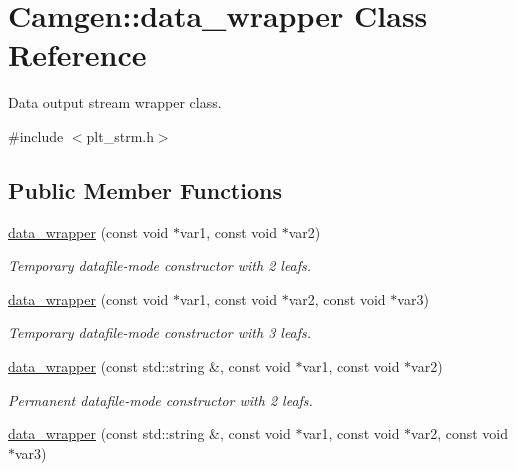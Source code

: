 \hypertarget{a00118}{\section{Camgen\-:\-:data\-\_\-wrapper Class Reference}
\label{a00118}
}


Data output stream wrapper class.  




{\ttfamily \#include $<$plt\-\_\-strm.\-h$>$}

\subsection*{Public Member Functions}
\begin{DoxyCompactItemize}
\item 
\hypertarget{a00118_a6cd8e44f93a3b9bd5d26f92fa41e60e0}{\hyperlink{a00118_a6cd8e44f93a3b9bd5d26f92fa41e60e0}{data\-\_\-wrapper} (const void $\ast$var1, const void $\ast$var2)}\label{a00118_a6cd8e44f93a3b9bd5d26f92fa41e60e0}

\begin{DoxyCompactList}\small\item\em Temporary datafile-\/mode constructor with 2 leafs. \end{DoxyCompactList}\item 
\hypertarget{a00118_ab7febefd6f251fdcbb279389f7dab4c0}{\hyperlink{a00118_ab7febefd6f251fdcbb279389f7dab4c0}{data\-\_\-wrapper} (const void $\ast$var1, const void $\ast$var2, const void $\ast$var3)}\label{a00118_ab7febefd6f251fdcbb279389f7dab4c0}

\begin{DoxyCompactList}\small\item\em Temporary datafile-\/mode constructor with 3 leafs. \end{DoxyCompactList}\item 
\hypertarget{a00118_a79ef419d020f7baf11dafb83ffe6d837}{\hyperlink{a00118_a79ef419d020f7baf11dafb83ffe6d837}{data\-\_\-wrapper} (const std\-::string \&, const void $\ast$var1, const void $\ast$var2)}\label{a00118_a79ef419d020f7baf11dafb83ffe6d837}

\begin{DoxyCompactList}\small\item\em Permanent datafile-\/mode constructor with 2 leafs. \end{DoxyCompactList}\item 
\hypertarget{a00118_ac7ffb36f13890d5771591a1b50c17cfd}{\hyperlink{a00118_ac7ffb36f13890d5771591a1b50c17cfd}{data\-\_\-wrapper} (const std\-::string \&, const void $\ast$var1, const void $\ast$var2, const void $\ast$var3)}\label{a00118_ac7ffb36f13890d5771591a1b50c17cfd}


\end{DoxyCompactItemize}
